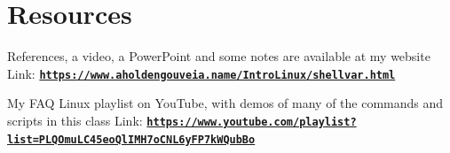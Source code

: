 \documentclass[12pt]{article}
\begin{document}
\section*{Resources}
References, a video, a PowerPoint and some notes are available at my website
Link: \href{https://www.aholdengouveia.name/IntroLinux/shellvar.html}{\textbf{\nolinkurl{https://www.aholdengouveia.name/IntroLinux/shellvar.html}}}

My FAQ Linux playlist on YouTube, with demos of many of the commands and scripts in this class
Link: \href{https://www.youtube.com/playlist?list=PLQOmuLC45eoQlIMH7oCNL6yFP7kWQubBo}{\textbf{\nolinkurl{https://www.youtube.com/playlist?list=PLQOmuLC45eoQlIMH7oCNL6yFP7kWQubBo}}}
\end{document}
